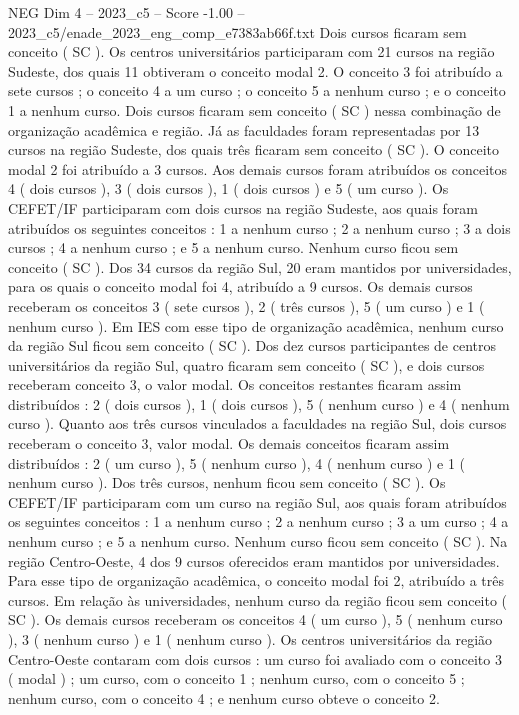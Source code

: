 \begin{textsample}{NEG Dim 4 – 2023\_c5 – Score -1.00 – 2023\_c5/enade\_2023\_eng\_comp\_e7383ab66f.txt}
Dois cursos ficaram sem conceito ( SC ).
Os centros universitários participaram com 21 cursos na região Sudeste, dos quais 11 obtiveram o conceito modal 2.
O conceito 3 foi atribuído a sete cursos ; o conceito 4 a um curso ; o conceito 5 a nenhum curso ; e o conceito 1 a nenhum curso.
Dois cursos ficaram sem conceito ( SC ) nessa combinação de organização acadêmica e região.
Já as faculdades foram representadas por 13 cursos na região Sudeste, dos quais três ficaram sem conceito ( SC ).
O conceito modal 2 foi atribuído a 3 cursos.
Aos demais cursos foram atribuídos os conceitos 4 ( dois cursos ), 3 ( dois cursos ), 1 ( dois cursos ) e 5 ( um curso ).
Os CEFET/IF participaram com dois cursos na região Sudeste, aos quais foram atribuídos os seguintes conceitos : 1 a nenhum curso ; 2 a nenhum curso ; 3 a dois cursos ; 4 a nenhum curso ; e 5 a nenhum curso.
Nenhum curso ficou sem conceito ( SC ).
Dos 34 cursos da região Sul, 20 eram mantidos por universidades, para os quais o conceito modal foi 4, atribuído a 9 cursos.
Os demais cursos receberam os conceitos 3 ( sete cursos ), 2 ( três cursos ), 5 ( um curso ) e 1 ( nenhum curso ).
Em IES com esse tipo de organização acadêmica, nenhum curso da região Sul ficou sem conceito ( SC ).
Dos dez cursos participantes de centros universitários da região Sul, quatro ficaram sem conceito ( SC ), e dois cursos receberam conceito 3, o valor modal.
Os conceitos restantes ficaram assim distribuídos : 2 ( dois cursos ), 1 ( dois cursos ), 5 ( nenhum curso ) e 4 ( nenhum curso ).
Quanto aos três cursos vinculados a faculdades na região Sul, dois cursos receberam o conceito 3, valor modal.
Os demais conceitos ficaram assim distribuídos : 2 ( um curso ), 5 ( nenhum curso ), 4 ( nenhum curso ) e 1 ( nenhum curso ).
Dos três cursos, nenhum ficou sem conceito ( SC ).
Os CEFET/IF participaram com um curso na região Sul, aos quais foram atribuídos os seguintes conceitos : 1 a nenhum curso ; 2 a nenhum curso ; 3 a um curso ; 4 a nenhum curso ; e 5 a nenhum curso.
Nenhum curso ficou sem conceito ( SC ).
Na região Centro-Oeste, 4 dos 9 cursos oferecidos eram mantidos por universidades.
Para esse tipo de organização acadêmica, o conceito modal foi 2, atribuído a três cursos.
Em relação às universidades, nenhum curso da região ficou sem conceito ( SC ).
Os demais cursos receberam os conceitos 4 ( um curso ), 5 ( nenhum curso ), 3 ( nenhum curso ) e 1 ( nenhum curso ).
Os centros universitários da região Centro-Oeste contaram com dois cursos : um curso foi avaliado com o conceito 3 ( modal ) ; um curso, com o conceito 1 ; nenhum curso, com o conceito 5 ; nenhum curso, com o conceito 4 ; e nenhum curso obteve o conceito 2.

\end{textsample}
